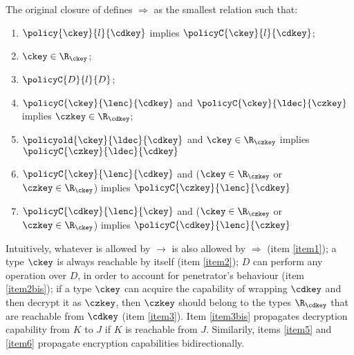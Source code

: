 The original closure of \cite{focardi2021secure} defines $\Rightarrow$ as the smallest relation such that:
\begin{enumerate}
    \item $\policy{\ckey}{l}{\cdkey}$ implies $\policyC{\ckey}{l}{\cdkey}$;
      \label{item1}
    \item $\ckey \in \R_\ckey$;
      \label{item2}
    \item $\policyC{D}{l}{D}$;
      \label{item2bis}
    \item $\policyC{\ckey}{\lenc}{\cdkey}$ and $\policyC{\ckey}{\ldec}{\czkey}$ implies $\czkey \in \R_\cdkey$;
      \label{item3}
      \item $\policyold{\ckey}{\ldec}{\cdkey}$ and $\ckey \in \R_\czkey$ implies $\policyC{\czkey}{\ldec}{\cdkey}$
     \label{item3bis}
  \item $\policyC{\ckey}{\lenc}{\cdkey}$ and ($\ckey \in \R_\czkey$ or $\czkey \in \R_\ckey$) implies $\policyC{\czkey}{\lenc}{\cdkey}$
       \label{item5}
  \item $\policyC{\cdkey}{\lenc}{\ckey}$ and ($\ckey \in \R_\czkey$ or $\czkey \in \R_\ckey$) implies $\policyC{\cdkey}{\lenc}{\czkey}$
       \label{item6}
  \end{enumerate}
Intuitively,  whatever is allowed by $\rightarrow$ is also allowed by $\Rightarrow$ (item \ref{item1}); a type $\ckey$ is always reachable by itself (item \ref{item2}); $D$ can perform any operation over  $D$, in order to account for penetrator's behaviour (item \ref{item2bis}); if a type $\ckey$ can acquire the capability of wrapping $\cdkey$ and then decrypt it as $\czkey$, then $\czkey$ should belong to the types $\R_\cdkey$ that are reachable from $\cdkey$ (item \ref{item3}). Item \ref{item3bis} propagates decryption capability from $K$ to $J$ if $K$ is reachable from $J$. Similarily, items \ref{item5} and \ref{item6} propagate encryption capabilities bidirectionally.

